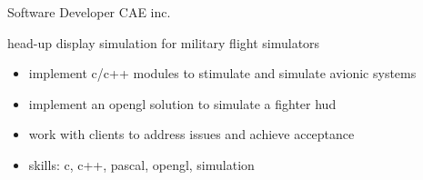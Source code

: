 \documentclass[print]{friggeri-cv}
\begin{document}
\begin{entrylist}





  {Software Developer} {\scriptsize{CAE} inc.}
  {head-up display simulation for military flight simulators
  \begin{itemize}
    \item implement c/c++ modules to stimulate and simulate avionic systems
    \item implement an opengl solution to simulate a fighter hud
    \item work with clients to address issues and achieve acceptance
    \item skills: c, c++, pascal, opengl, simulation
  \end{itemize}
  }


\end{entrylist}
\end{document}
